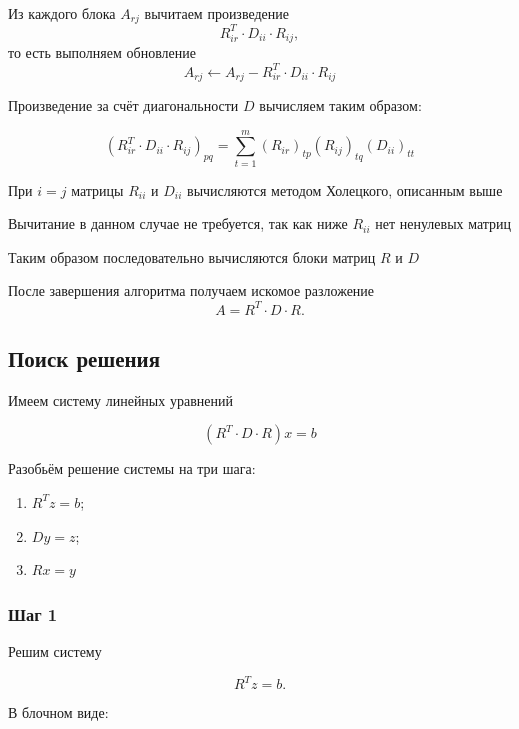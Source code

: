 \documentclass[a4paper,12pt]{article}
\begin{document}
Из каждого блока $A_{rj}$ вычитаем произведение
$$
R_{ir}^{T} \cdot D_{ii} \cdot R_{ij},
$$
то есть выполняем обновление
$$
A_{rj}
\leftarrow
A_{rj}
-
R_{ir}^{T} \cdot D_{ii} \cdot R_{ij}
$$

Произведение за счёт диагональности $D$ вычисляем таким образом:

$$
(R_{ir}^{T} \cdot D_{ii} \cdot R_{ij})_{pq} = \sum_{t = 1}^{m} (R_{ir})_{tp} (R_{ij})_{tq} (D_{ii})_{tt} 
$$

При $i=j$ матрицы $R_{ii}$ и $D_{ii}$ вычисляются методом Холецкого,
описанным выше

Вычитание в данном случае не требуется, так как ниже $R_{ii}$ нет ненулевых матриц

Таким образом последовательно вычисляются блоки матриц $R$ и $D$

После завершения алгоритма получаем искомое разложение
$$
A = R^{T} \cdot D \cdot R.
$$

\subsection{Поиск решения}

Имеем систему линейных уравнений

$$
(R^T \cdot D \cdot R)x = b
$$

Разобьём решение системы на три шага:

\begin{enumerate}
  \item $R^T z = b$;
  \item $D y = z$;
  \item $R x = y$
\end{enumerate}


\subsubsection{Шаг 1}

Решим систему

$$
R^T z = b.
$$

В блочном виде:
\end{document}
